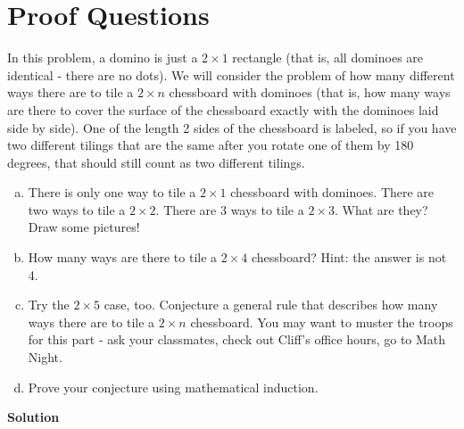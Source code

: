 \documentclass[11pt]{scrartcl}
\theoremstyle{dotlessP}
\theoremstyle{dotlessN}
\begin{document}
\section{Proof Questions}
\begin{ques}
	 In this problem, a domino is just a $2 \times 1$ rectangle (that is, all dominoes are identical - there are no dots). We will consider the problem of how many different ways there are to tile a $2 \times n$ chessboard with dominoes (that is, how many ways are there to cover the surface of the chessboard exactly with the dominoes laid side by side). One of the length 2 sides of the chessboard is labeled, so if you have two different tilings that are the same after you rotate one of them by 180 degrees, that should still count as two different tilings.
\begin{enumerate}[(a)]
        \item There is only one way to tile a  $2 \times 1$ chessboard with dominoes. There are two ways to tile a  $2 \times 2$. There are 3 ways to tile a  $2 \times 3$. What are they? Draw some pictures!
        \item How many ways are there to tile a  $2 \times 4$ chessboard? Hint: the answer is not 4.
        \item Try the  $2 \times 5$ case, too. Conjecture a general rule that describes how many ways there are to tile a  $2 \times n$ chessboard. You may want to muster the troops for this part - ask your classmates, check out Cliff's office hours, go to Math Night.
        \item Prove your conjecture using mathematical induction.
    \end{enumerate}
\end{ques}
\textbf{Solution}
\end{document}

